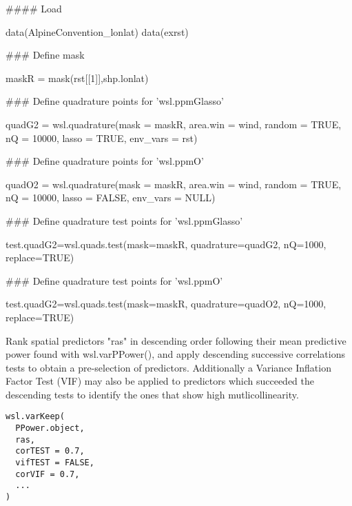 \documentclass[a4paper]{book}
\begin{document}
\begin{Examples}
\begin{ExampleCode}

#### Load

data(AlpineConvention_lonlat)
data(exrst)

### Define mask

maskR = mask(rst[[1]],shp.lonlat)

### Define quadrature points for 'wsl.ppmGlasso'

quadG2 = wsl.quadrature(mask = maskR,
                        area.win = wind,
                        random = TRUE,
                        nQ = 10000,
                        lasso = TRUE,
                        env_vars = rst)

### Define quadrature points for 'wsl.ppmO'

quadO2 = wsl.quadrature(mask = maskR,
                        area.win = wind,
                        random = TRUE,
                        nQ = 10000,
                        lasso = FALSE,
                        env_vars = NULL)

### Define quadrature test points for 'wsl.ppmGlasso'

test.quadG2=wsl.quads.test(mask=maskR,
                           quadrature=quadG2,
                           nQ=1000,
                           replace=TRUE)


### Define quadrature test points for 'wsl.ppmO'

test.quadG2=wsl.quads.test(mask=maskR,
                           quadrature=quadO2,
                           nQ=1000,
                           replace=TRUE)


\end{ExampleCode}
\end{Examples}
%
\begin{Description}\relax
Rank spatial predictors "ras" in descending order following their mean predictive
power found with wsl.varPPower(), and apply descending successive correlations tests
to obtain a pre-selection of predictors. Additionally a Variance Inflation Factor
Test (VIF) may also be applied to predictors which succeeded the descending tests to
identify the ones that show high mutlicollinearity.
\end{Description}
%
\begin{Usage}
\begin{verbatim}
wsl.varKeep(
  PPower.object,
  ras,
  corTEST = 0.7,
  vifTEST = FALSE,
  corVIF = 0.7,
  ...
)
\end{verbatim}
\end{Usage}
\end{document}
